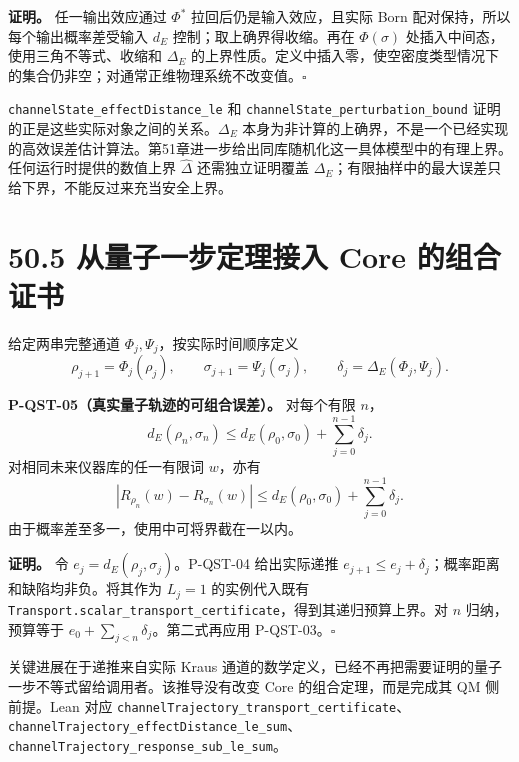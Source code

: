 \documentclass[
  11pt,
  oneside]{book}
\begin{document}
\textbf{证明。} 任一输出效应通过 \(\Phi^*\) 拉回后仍是输入效应，且实际
Born 配对保持，所以每个输出概率差受输入 \(d_E\)
控制；取上确界得收缩。再在 \(\Phi(\sigma)\)
处插入中间态，使用三角不等式、收缩和 \(\Delta_E\)
的上界性质。定义中插入零，使空密度类型情况下的集合仍非空；对通常正维物理系统不改变值。\(\square\)

\texttt{channel\allowbreak State\_\allowbreak effect\allowbreak Distance\_\allowbreak le} 和
\texttt{channel\allowbreak State\_\allowbreak perturbation\_\allowbreak bound}
证明的正是这些实际对象之间的关系。\(\Delta_E\)
本身为非计算的上确界，不是一个已经实现的高效误差估计算法。第51章进一步给出同库随机化这一具体模型中的有理上界。任何运行时提供的数值上界
\(\widehat\Delta\) 还需独立证明覆盖
\(\Delta_E\)；有限抽样中的最大误差只给下界，不能反过来充当安全上界。

\section{50.5 从量子一步定理接入 Core 的组合证书}

给定两串完整通道 \(\Phi_j,\Psi_j\)，按实际时间顺序定义 \[
\rho_{j+1}=\Phi_j(\rho_j),\qquad
\sigma_{j+1}=\Psi_j(\sigma_j),\qquad
\delta_j=\Delta_E(\Phi_j,\Psi_j).
\]

\protect\hypertarget{p-qst-05}{}{}

\textbf{P-QST-05（真实量子轨迹的可组合误差）。} 对每个有限 \(n\)， \[
d_E(\rho_n,\sigma_n)
\le d_E(\rho_0,\sigma_0)+\sum_{j=0}^{n-1}\delta_j.
\] 对相同未来仪器库的任一有限词 \(w\)，亦有 \[
|R_{\rho_n}(w)-R_{\sigma_n}(w)|
\le d_E(\rho_0,\sigma_0)+\sum_{j=0}^{n-1}\delta_j.
\] 由于概率差至多一，使用中可将界截在一以内。

\textbf{证明。} 令 \(e_j=d_E(\rho_j,\sigma_j)\)。P-QST-04 给出实际递推
\(e_{j+1}\le e_j+\delta_j\)；概率距离和缺陷均非负。将其作为 \(L_j=1\)
的实例代入既有
\texttt{Transport.\allowbreak scalar\_\allowbreak transport\_\allowbreak certificate}，得到其递归预算上界。对
\(n\) 归纳，预算等于 \(e_0+\sum_{j<n}\delta_j\)。第二式再应用
P-QST-03。\(\square\)

关键进展在于递推来自实际 Kraus
通道的数学定义，已经不再把需要证明的量子一步不等式留给调用者。该推导没有改变
Core 的组合定理，而是完成其 QM 侧前提。Lean 对应
\texttt{channel\allowbreak Trajectory\_\allowbreak transport\_\allowbreak certificate}、\allowbreak \texttt{channel\allowbreak Trajectory\_\allowbreak effect\allowbreak Distance\_\allowbreak le\_\allowbreak sum}、\allowbreak \texttt{channel\allowbreak Trajectory\_\allowbreak response\_\allowbreak sub\_\allowbreak le\_\allowbreak sum}。
\end{document}
